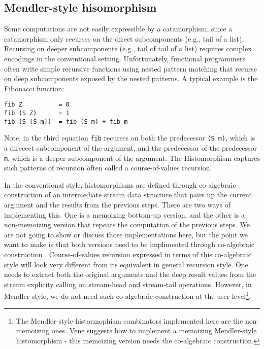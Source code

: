 \documentclass[letterpaper,12pt]{article}
\begin{document}
\subsection{Mendler-style hisomorphism} \label{sec:bg:mhist}

Some computations are not easily expressible by a catamorphism,
since a catamorphism only recurses on the direct subcomponents (e.g., tail
of a list). Recursing on deeper subcomponents (e.g., tail of tail of a list)
requires complex encodings in the conventional setting. Unfortunately,
functional programmers often write simple recursive functions using
nested pattern matching that recurse on deep subcomponents exposed by
the nested patterns.  A typical example is the Fibonacci function:
\begin{verbatim}
fib Z          = 0
fib (S Z)      = 1
fib (S (S m))  = fib (S m) + fib m
\end{verbatim}
Note, in the third equation \verb|fib| recurses on both the predecessor \verb|(S m)|,
which is a direcect subcomponent of the argument, and the predecessor of
the predecessor \verb|m|, which is a deeper subcomponent of the argument.
The Histomorphism \cite{UusVen99histo} captures such patterns of recursion
often called a course-of-values recursion.

In the conventional style, histomorphisms are defined through co-algebraic
construction of an intermediate stream data structure that pairs up the
current argument and the results from the previous steps.
There are two ways of implementing this.  One is a memoizing bottom-up version,
and the other is a non-memoizing version that repeats the computation of
the previous steps.  We are not going to show or discuss those implementations
here, but the point we want to make is that both versions need to be
implimented through co-algebraic construction \cite{UusVen00,vene00phd}.
Course-of-values recursion expressed in terms of this co-algebraic style will
look very different from its equivalent in general recursion style. One needs
to extract both the original arguments and the deep result values from the
stream explicity calling on stream-head and stream-tail operations.
However, in Mendler-style, we do not need such co-algebraic construction
at the user level\footnote{The Mendler-style histormophism combinators
implemented here are the non-memoizing ones. Vene\cite{vene00phd} suggests
how to implement a memoizing  Mendler-style histomorphism -
this memoizing version needs the co-algebraic construction.}.
\end{document}

